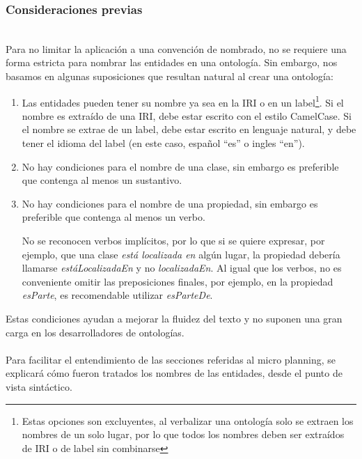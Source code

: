 \subsubsection{Consideraciones previas}
 \\
Para no limitar la aplicación a una convención de nombrado, no se requiere una forma estricta para nombrar las entidades en una ontología. Sin embargo, nos basamos en algunas suposiciones que resultan natural al crear una ontología:
\begin{enumerate}
    \item Las entidades pueden tener su nombre ya sea en la IRI o en un label\footnote{Estas opciones son excluyentes, al verbalizar una ontología solo se extraen los nombres de un solo lugar, por lo que todos los nombres deben ser extraídos de IRI o de label sin combinarse}. Si el nombre es extraído de una IRI, debe estar escrito con el estilo CamelCase. Si el nombre se extrae de un label, debe estar escrito en lenguaje natural, y debe tener el idioma del label (en este caso, español ``es'' o ingles ``en'').
    \item No hay condiciones para el nombre de una clase, sin embargo es preferible que contenga al menos un sustantivo.
    \item No hay condiciones para el nombre de una propiedad, sin embargo es preferible que contenga al menos un verbo. 
    
    No se reconocen verbos implícitos, por lo que si se quiere expresar, por ejemplo, que una clase \emph{está localizada en} algún lugar, la propiedad debería llamarse \emph{estáLocalizadaEn} y no \emph{localizadaEn}. Al igual que los verbos, no es conveniente omitir las preposiciones finales, por ejemplo, en la propiedad \emph{esParte}, es recomendable utilizar \emph{esParteDe}.
\end{enumerate}

Estas condiciones ayudan a mejorar la fluidez del texto y no suponen una gran carga en los desarrolladores de ontologías.
\\

\\
Para facilitar el entendimiento de las secciones referidas al micro planning, se explicará cómo fueron tratados los nombres de las entidades, desde el punto de vista sintáctico. 

